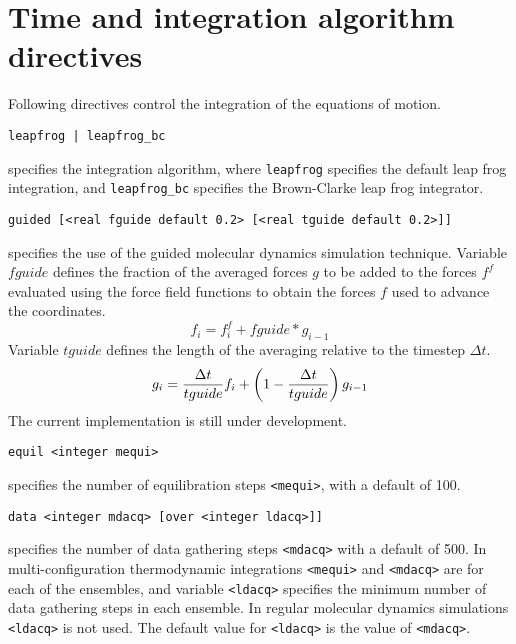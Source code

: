 \section{Time and integration algorithm directives}
Following directives control the integration of the equations of motion.
\begin{description}

\item
\begin{verbatim}
leapfrog | leapfrog_bc
\end{verbatim}
specifies the integration algorithm,
where {\tt leapfrog} specifies the default leap frog integration, and
{\tt leapfrog\_bc} specifies the Brown-Clarke leap frog integrator.

\item
\begin{verbatim}
guided [<real fguide default 0.2> [<real tguide default 0.2>]]
\end{verbatim}
specifies the use of the guided molecular dynamics simulation
technique. Variable $fguide$ defines the fraction of the averaged
forces $g$ to be added to the forces $f^{f}$ evaluated using the force
field functions to obtain the forces $f$ used to advance the coordinates.
\begin{equation}
f_i=f^{f}_i+fguide * g_{i-1}
\end{equation}
Variable $tguide$ defines the length of the averaging relative to the
timestep $\Delta t$.
\begin{equation}
g_i = {\Delta t\over tguide} f_i + \left(1- {\Delta t\over tguide}\right)
g_{i-1}
\end{equation}
The current implementation is still under 
development.

\item
\begin{verbatim}
equil <integer mequi>
\end{verbatim}
specifies the number of equilibration steps \verb+<mequi>+, with a default
of 100.

\item
\begin{verbatim}
data <integer mdacq> [over <integer ldacq>]]
\end{verbatim}
specifies the number of data gathering steps \verb+<mdacq>+ with a
default of 500. In multi-configuration thermodynamic integrations
\verb+<mequi>+ and \verb+<mdacq>+ are for each of the ensembles, and
variable \verb+<ldacq>+ specifies the minimum number of data gathering steps 
in each ensemble. In regular molecular dynamics simulations \verb+<ldacq>+
is not used. The default value for \verb+<ldacq>+ is the value of \verb+<mdacq>+.


\end{description}
